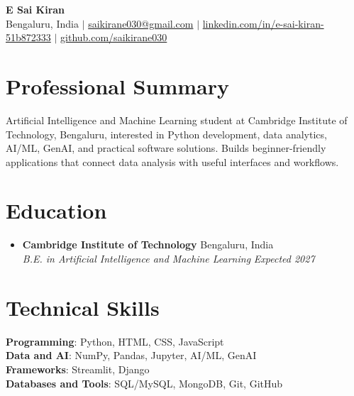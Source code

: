 \documentclass[letterpaper, 11pt]{article}
\newcommand{\resumeSubheading}[4]{\vspace{-2pt}\item\textbf{#1} \hfill #2 \\
  \textit{\small#3} \hfill \textit{\small #4} \vspace{-7pt}}
\newcommand{\resumeSubHeadingListStart}{\begin{itemize}[leftmargin=0.15in, label={}]}
\newcommand{\resumeSubHeadingListEnd}{\end{itemize}}
\begin{document}
\begin{center}
    \textbf{\Huge E Sai Kiran} \\ \vspace{4pt}
    \small Bengaluru, India $|$ \href{mailto:saikirane030@gmail.com}{saikirane030@gmail.com} $|$
    \href{https://www.linkedin.com/in/e-sai-kiran-51b872333/}{linkedin.com/in/e-sai-kiran-51b872333} $|$
    \href{https://github.com/saikirane030}{github.com/saikirane030}
\end{center}

\section{Professional Summary}
Artificial Intelligence and Machine Learning student at Cambridge Institute of Technology, Bengaluru, interested in Python development, data analytics, AI/ML, GenAI, and practical software solutions. Builds beginner-friendly applications that connect data analysis with useful interfaces and workflows.

\section{Education}
  \resumeSubHeadingListStart
    \resumeSubheading
      {Cambridge Institute of Technology}{Bengaluru, India}
      {B.E. in Artificial Intelligence and Machine Learning}{Expected 2027}
  \resumeSubHeadingListEnd

\section{Technical Skills}
 \begin{itemize}[leftmargin=0.15in, label={}]
    \small{\item{
     \textbf{Programming}: Python, HTML, CSS, JavaScript \\
     \textbf{Data and AI}: NumPy, Pandas, Jupyter, AI/ML, GenAI \\
     \textbf{Frameworks}: Streamlit, Django \\
     \textbf{Databases and Tools}: SQL/MySQL, MongoDB, Git, GitHub
    }}
 \end{itemize}
\end{document}

